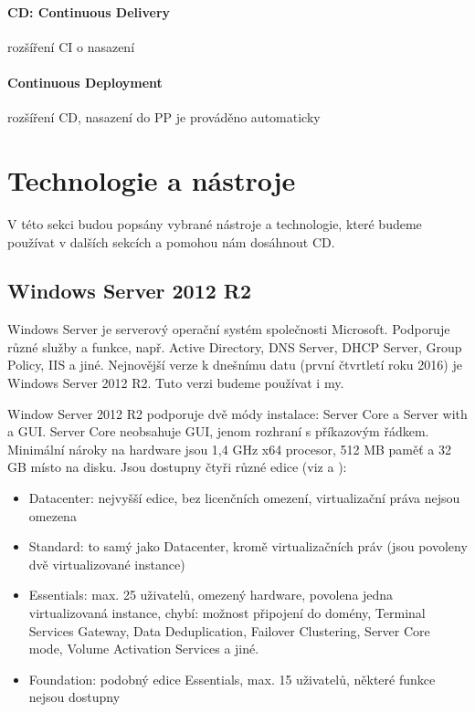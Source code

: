 \paragraph{CD: Continuous Delivery} rozšíření CI o nasazení
\paragraph{Continuous Deployment} rozšíření CD, nasazení do PP je prováděno automaticky

\section{Technologie a nástroje}
V této sekci budou popsány vybrané nástroje a technologie, které budeme používat v dalších sekcích a pomohou nám dosáhnout CD.

\subsection{Windows Server 2012 R2}
Windows Server je serverový operační systém společnosti Microsoft. Podporuje různé služby a funkce, např. Active Directory, DNS Server, DHCP Server, Group Policy, IIS a jiné. Nejnovější verze k dnešnímu datu (první čtvrtletí roku 2016) je Windows Server 2012 R2. Tuto verzi budeme používat i my. \cite{MasteringWindowsServer}

Window Server 2012 R2 podporuje dvě módy instalace: Server Core a Server with a GUI. Server Core neobsahuje GUI, jenom rozhraní s příkazovým řádkem. Minimální nároky na hardware jsou 1,4 GHz x64 procesor, 512 MB paměť a 32 GB místo na disku. Jsou dostupny čtyři různé edice (viz \cite{WindowsServer2012Editions} a \cite{WindowsServer2012Licensing}):

\begin{itemize}
\item Datacenter: nejvyšší edice, bez licenčních omezení, virtualizační práva nejsou omezena
\item Standard: to samý jako Datacenter, kromě virtualizačních práv (jsou povoleny dvě virtualizované instance)
\item Essentials: max. 25 uživatelů, omezený hardware, povolena jedna virtualizovaná instance, chybí: možnost připojení do domény, Terminal Services Gateway, Data Deduplication, Failover Clustering, Server Core mode, Volume Activation Services a jiné.
\item Foundation: podobný edice Essentials, max. 15 uživatelů, některé funkce nejsou dostupny
\end{itemize}

